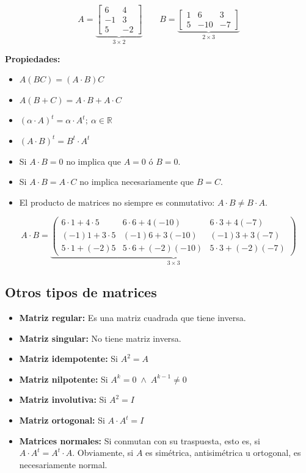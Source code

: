 \documentclass[11pt,a4paper]{article}
\begin{document}
\begin{minipage}[t]{0.533\textwidth}
\[
A = \underbrace{\begin{bmatrix} 6 & 4\\ -1 & 3\\ 5 & -2\end{bmatrix}}_{3\times2}
\qquad
B = \underbrace{\begin{bmatrix} 1 & 6 & 3\\ 5 & -10 & -7\end{bmatrix}}_{2\times3}
\]
\end{minipage}\hfill
\begin{minipage}[t]{0.436\textwidth}
\textbf{Propiedades:}
\begin{itemize}[label=\textcolor{naranja}{\checkmark}]
  \item $A(BC) = (A\cdot B)C$
  \item $A(B + C) = A\cdot B + A\cdot C$
  \item $(\alpha\cdot A)^t = \alpha\cdot A^t;\ \alpha \in \mathbb{R}$
  \item $(A\cdot B)^t = B^t\cdot A^t$
  \item Si $A\cdot B = 0$ no implica que $A = 0$ ó $B = 0$.
  \item Si $A\cdot B = A\cdot C$ no implica necesariamente que $B = C$.
  \item El producto de matrices no siempre es conmutativo: $A\cdot B \neq B\cdot A$.
\end{itemize}
\end{minipage}
\[
A\cdot B = \underbrace{\begin{pmatrix}
6\cdot1 + 4\cdot5 & 6\cdot6 + 4(-10) & 6\cdot3 + 4(-7)\\
(-1)1 + 3\cdot5 & (-1)6 + 3(-10) & (-1)3 + 3(-7)\\
5\cdot1 + (-2)5 & 5\cdot6 + (-2)(-10) & 5\cdot3 + (-2)(-7)
\end{pmatrix}}_{3\times3}
\]


\subsection*{Otros tipos de matrices}
\begin{itemize}[label={}]
  \item \textbf{Matriz regular:} Es una matriz cuadrada que tiene inversa.
  \item \textbf{Matriz singular:} No tiene matriz inversa.
  \item \textbf{Matriz idempotente:} Si $A^2 = A$
  \item \textbf{Matriz nilpotente:} Si $A^k = 0 \;\wedge\; A^{k-1} \neq 0$
  \item \textbf{Matriz involutiva:} Si $A^2 = I$
  \item \textbf{Matriz ortogonal:} Si $A\cdot A^t = I$
  \item \textbf{Matrices normales:} Si conmutan con su traspuesta, esto es, si
  $A\cdot A^t = A^t\cdot A$. Obviamente, si $A$ es simétrica, antisimétrica u ortogonal,
  es necesariamente normal.
\end{itemize}
\end{document}
